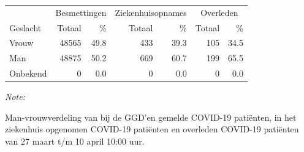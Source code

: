 \documentclass[
  english,
  man,floatsintext]{apa6}
\begin{document}
\begin{table}
\centering\begingroup\fontsize{11}{13}\selectfont

\begin{threeparttable}
\begin{tabular}{lrrrrrr}
\toprule
\multicolumn{1}{c}{ } & \multicolumn{2}{c}{Besmettingen} & \multicolumn{2}{c}{Ziekenhuisopnames} & \multicolumn{2}{c}{Overleden} \\
\cmidrule(l{3pt}r{3pt}){2-3} \cmidrule(l{3pt}r{3pt}){4-5} \cmidrule(l{3pt}r{3pt}){6-7}
Geslacht & Totaal & \% & Totaal & \% & Totaal & \%\\
\midrule
Vrouw & 48565 & 49.8 & 433 & 39.3 & 105 & 34.5\\
Man & 48875 & 50.2 & 669 & 60.7 & 199 & 65.5\\
Onbekend & 0 & 0.0 & 0 & 0.0 & 0 & 0.0\\
\bottomrule
\end{tabular}
\begin{tablenotes}
\item \textit{Note: } 
\item Man-vrouwverdeling van bij de GGD’en gemelde COVID-19 patiënten, in het ziekenhuis opgenomen COVID-19 patiënten en overleden COVID-19 patiënten van 27 maart t/m 10 april 10:00 uur.
\end{tablenotes}
\end{threeparttable}
\endgroup{}
\end{table}
\newpage
\end{document}
